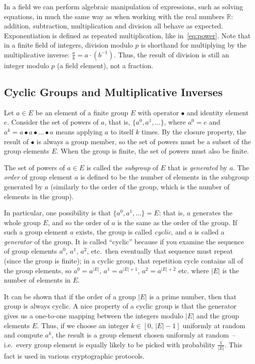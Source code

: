 \documentclass{article}
\begin{document}
In a field we can perform algebraic manipulation of expressions, such as solving equations, in much the same way as when working with the real numbers $\mathbb{R}$: addition, subtraction, multiplication and division all behave as expected.
Exponentiation is defined as repeated multiplication, like in~\eqref{eq:power}.
Note that in a finite field of integers, division modulo $p$ is shorthand for multiplying by the multiplicative inverse: $\frac{a}{b} = a \cdot (b^{-1})$.
Thus, the result of division is still an integer modulo $p$ (a field element), not a fraction.

\subsection{Cyclic Groups and Multiplicative Inverses}\label{sec:cyclic}

Let $a \in E$ be an element of a finite group $E$ with operator $\bullet$ and identity element $e$.
Consider the set of powers of $a$, that is, $\{a^0, a^1, \dots\}$, where $a^0 = e$ and $a^k = a \bullet a \bullet \dots \bullet a$ means applying $a$ to itself $k$ times.
By the closure property, the result of $\bullet$ is always a group member, so the set of powers must be a subset of the group elements $E$.
When the group is finite, the set of powers must also be finite.

The set of powers of $a \in E$ is called the \emph{subgroup} of $E$ that is \emph{generated} by $a$.
The \emph{order} of group element $a$ is defined to be the number of elements in the subgroup generated by $a$ (similarly to the order of the group, which is the number of elements in the group).

In particular, one possibility is that $\{a^0, a^1, \dots\} = E$: that is, $a$ generates the whole group $E$, and so the order of $a$ is the same as the order of the group.
If such a group element $a$ exists, the group is called \emph{cyclic}, and $a$ is called a \emph{generator} of the group.
It is called ``cyclic'' because if you examine the sequence of group elements $a^0$, $a^1$, $a^2$, etc.\ then eventually that sequence must repeat (since the group is finite); in a cyclic group, that repetition cycle contains all of the group elements, so $a^0 = a^{|E|}$, $a^1 = a^{|E|+1}$, $a^2 = a^{|E|+2}$ etc. where $|E|$ is the number of elements in $E$.

It can be shown that if the order of a group $|E|$ is a prime number, then that group is always cyclic.
A nice property of a cyclic group is that the generator gives us a one-to-one mapping between the integers modulo $|E|$ and the group elements $E$.
Thus, if we choose an integer $k \in [0,\, |E|-1]$ uniformly at random and compute $a^k$, the result is a group element chosen uniformly at random~-- i.e.\ every group element is equally likely to be picked with probability $\frac{1}{|E|}$.
This fact is used in various cryptographic protocols.
\end{document}

